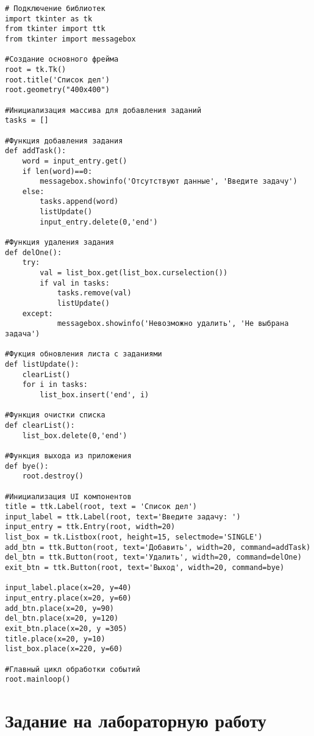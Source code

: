 \documentclass[a4paper]{article}
\begin{document}
\begin{lstlisting}[label=todo, caption=Список дел]
# Подключение библиотек
import tkinter as tk
from tkinter import ttk
from tkinter import messagebox

#Создание основного фрейма
root = tk.Tk()
root.title('Список дел')
root.geometry("400x400")

#Инициализация массива для добавления заданий
tasks = []

#Функция добавления задания
def addTask():
    word = input_entry.get()
    if len(word)==0:
        messagebox.showinfo('Отсутствуют данные', 'Введите задачу')
    else:
        tasks.append(word)
        listUpdate()
        input_entry.delete(0,'end')

#Функция удаления задания
def delOne():
    try:
        val = list_box.get(list_box.curselection())
        if val in tasks:
            tasks.remove(val)
            listUpdate()
    except:
            messagebox.showinfo('Невозможно удалить', 'Не выбрана задача')

#Фукция обновления листа с заданиями
def listUpdate():
    clearList()
    for i in tasks:
        list_box.insert('end', i)

#Функция очистки списка
def clearList():
    list_box.delete(0,'end')

#Функция выхода из приложения
def bye():
    root.destroy()

#Инициализация UI компонентов
title = ttk.Label(root, text = 'Список дел')
input_label = ttk.Label(root, text='Введите задачу: ')
input_entry = ttk.Entry(root, width=20)
list_box = tk.Listbox(root, height=15, selectmode='SINGLE')
add_btn = ttk.Button(root, text='Добавить', width=20, command=addTask)
del_btn = ttk.Button(root, text='Удалить', width=20, command=delOne)
exit_btn = ttk.Button(root, text='Выход', width=20, command=bye)

input_label.place(x=20, y=40)
input_entry.place(x=20, y=60)
add_btn.place(x=20, y=90)
del_btn.place(x=20, y=120)
exit_btn.place(x=20, y =305)
title.place(x=20, y=10)
list_box.place(x=220, y=60)

#Главный цикл обработки событий
root.mainloop()
\end{lstlisting}

\newpage
\section{Задание на лабораторную работу}
\end{document}
